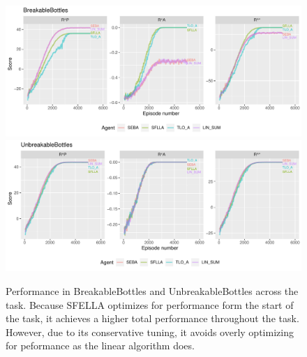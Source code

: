 \begin{figure}

  \includegraphics[width=\columnwidth]{output/multirun_n100_eeba_rolf_default_scale_progress_BreakableBottles.pdf}
  \includegraphics[width=\columnwidth]{output/multirun_n100_eeba_rolf_default_scale_progress_UnbreakableBottles.pdf}
  \caption{Performance in BreakableBottles and UnbreakableBottles across the task. Because SFELLA optimizes for performance form the start of the task, it achieves a higher total performance throughout the task. However, due to its conservative tuning, it avoids overly optimizing for peformance as the linear algorithm does.
  }
   \label{fig:bb_performance}
 \end{figure}



 
